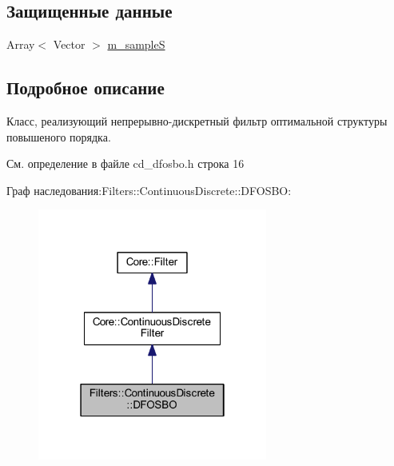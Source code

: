 \subsection*{Защищенные данные}
\begin{DoxyCompactItemize}
\item 
Array$<$ Vector $>$ \hyperlink{class_filters_1_1_continuous_discrete_1_1_d_f_o_s_b_o_affccb91872f23878db490d487c481606}{m\+\_\+sampleS}
\end{DoxyCompactItemize}


\subsection{Подробное описание}
Класс, реализующий непрерывно-\/дискретный фильтр оптимальной структуры повышеного порядка. 

См. определение в файле cd\+\_\+dfosbo.\+h строка 16



Граф наследования\+:Filters\+:\+:Continuous\+Discrete\+:\+:D\+F\+O\+S\+BO\+:
\nopagebreak
\begin{figure}[H]
\begin{center}
\leavevmode
\includegraphics[width=214pt]{class_filters_1_1_continuous_discrete_1_1_d_f_o_s_b_o__inherit__graph}
\end{center}
\end{figure}


